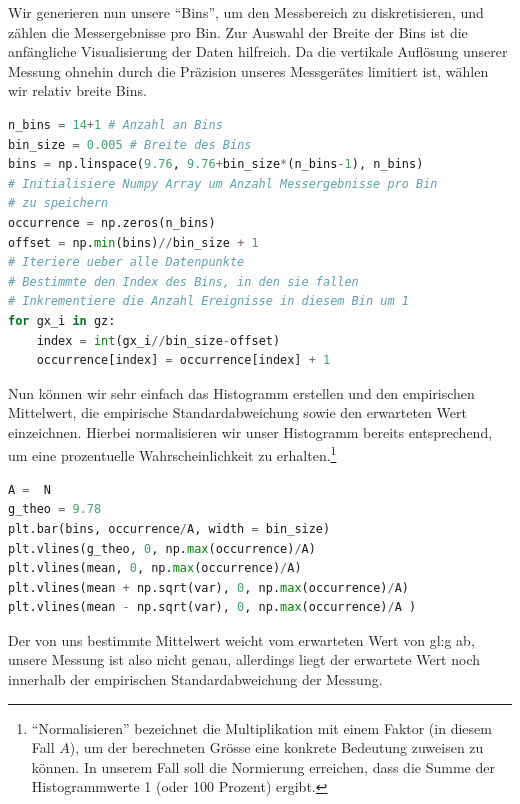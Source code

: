 Wir generieren nun unsere ``Bins'', um den Messbereich zu diskretisieren, und zählen die Messergebnisse pro Bin. Zur Auswahl der Breite der Bins ist die anfängliche Visualisierung der Daten hilfreich. Da die vertikale Auflösung unserer Messung ohnehin durch die Präzision unseres Messgerätes limitiert ist, wählen wir relativ breite Bins.  
\begin{lstlisting}[language = Python]
n_bins = 14+1 # Anzahl an Bins
bin_size = 0.005 # Breite des Bins 
bins = np.linspace(9.76, 9.76+bin_size*(n_bins-1), n_bins) 
# Initialisiere Numpy Array um Anzahl Messergebnisse pro Bin
# zu speichern
occurrence = np.zeros(n_bins)
offset = np.min(bins)//bin_size + 1
# Iteriere ueber alle Datenpunkte
# Bestimmte den Index des Bins, in den sie fallen
# Inkrementiere die Anzahl Ereignisse in diesem Bin um 1
for gx_i in gz:
    index = int(gx_i//bin_size-offset)
    occurrence[index] = occurrence[index] + 1
\end{lstlisting}
Nun können wir sehr einfach das Histogramm erstellen und den empirischen Mittelwert, die empirische Standardabweichung sowie den erwarteten Wert einzeichnen. Hierbei normalisieren wir unser Histogramm bereits entsprechend, um eine prozentuelle Wahrscheinlichkeit zu erhalten.\footnote{``Normalisieren'' bezeichnet die Multiplikation mit einem Faktor (in diesem Fall $A$), um der berechneten Grösse eine konkrete Bedeutung zuweisen zu können. In unserem Fall soll die Normierung erreichen, dass die Summe der Histogrammwerte 1 (oder 100 Prozent) ergibt.} 
\begin{lstlisting}[language = Python]
A =  N
g_theo = 9.78 
plt.bar(bins, occurrence/A, width = bin_size)
plt.vlines(g_theo, 0, np.max(occurrence)/A)
plt.vlines(mean, 0, np.max(occurrence)/A)
plt.vlines(mean + np.sqrt(var), 0, np.max(occurrence)/A)
plt.vlines(mean - np.sqrt(var), 0, np.max(occurrence)/A )
\end{lstlisting}
 Der von uns bestimmte Mittelwert weicht vom erwarteten Wert von  \gls{gl:g} ab, unsere Messung ist also nicht genau,  allerdings liegt der erwartete Wert noch innerhalb der empirischen Standardabweichung der Messung.

